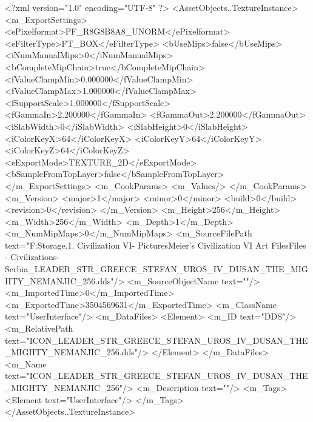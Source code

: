 <?xml version="1.0" encoding="UTF-8" ?>
<AssetObjects..TextureInstance>
	<m_ExportSettings>
		<ePixelformat>PF_R8G8B8A8_UNORM</ePixelformat>
		<eFilterType>FT_BOX</eFilterType>
		<bUseMips>false</bUseMips>
		<iNumManualMips>0</iNumManualMips>
		<bCompleteMipChain>true</bCompleteMipChain>
		<fValueClampMin>0.000000</fValueClampMin>
		<fValueClampMax>1.000000</fValueClampMax>
		<fSupportScale>1.000000</fSupportScale>
		<fGammaIn>2.200000</fGammaIn>
		<fGammaOut>2.200000</fGammaOut>
		<iSlabWidth>0</iSlabWidth>
		<iSlabHeight>0</iSlabHeight>
		<iColorKeyX>64</iColorKeyX>
		<iColorKeyY>64</iColorKeyY>
		<iColorKeyZ>64</iColorKeyZ>
		<eExportMode>TEXTURE_2D</eExportMode>
		<bSampleFromTopLayer>false</bSampleFromTopLayer>
	</m_ExportSettings>
	<m_CookParams>
		<m_Values/>
	</m_CookParams>
	<m_Version>
		<major>1</major>
		<minor>0</minor>
		<build>0</build>
		<revision>0</revision>
	</m_Version>
	<m_Height>256</m_Height>
	<m_Width>256</m_Width>
	<m_Depth>1</m_Depth>
	<m_NumMipMaps>0</m_NumMipMaps>
	<m_SourceFilePath text="F:\Mod Storage\2.1. Civilization VI\Mods\Archive - Pictures\Sid Meier's Civilization VI Art Files\Art Files - Civilizations\Civilization - Serbia\ICON_LEADER_STR_GREECE_STEFAN_UROS_IV_DUSAN_THE_MIGHTY_NEMANJIC_256.dds"/>
	<m_SourceObjectName text=""/>
	<m_ImportedTime>0</m_ImportedTime>
	<m_ExportedTime>3504569631</m_ExportedTime>
	<m_ClassName text="UserInterface"/>
	<m_DataFiles>
		<Element>
			<m_ID text="DDS"/>
			<m_RelativePath text="ICON_LEADER_STR_GREECE_STEFAN_UROS_IV_DUSAN_THE_MIGHTY_NEMANJIC_256.dds"/>
		</Element>
	</m_DataFiles>
	<m_Name text="ICON_LEADER_STR_GREECE_STEFAN_UROS_IV_DUSAN_THE_MIGHTY_NEMANJIC_256"/>
	<m_Description text=""/>
	<m_Tags>
		<Element text="UserInterface"/>
	</m_Tags>
</AssetObjects..TextureInstance>

